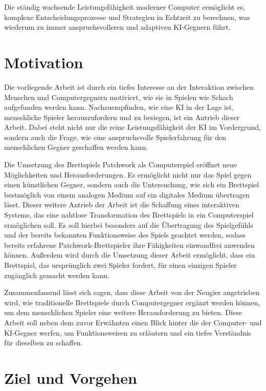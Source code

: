 Die ständig wachsende Leistungsfähigkeit moderner Computer ermöglicht es, komplexe Entscheidungsprozesse und Strategien in Echtzeit zu berechnen, was wiederum zu immer anspruchsvolleren und adaptiven \ac{KI}-Gegnern führt.

\section{Motivation}
\label{chapter:motivation}

Die vorliegende Arbeit ist durch ein tiefes Interesse an der Interaktion zwischen Menschen und Computergegnern motiviert, wie sie in Spielen wie Schach aufgefunden werden kann. Nachzuempfinden, wie eine \ac{KI} in der Lage ist, menschliche Spieler herauszufordern und zu besiegen, ist ein Antrieb dieser Arbeit. Dabei steht nicht nur die reine Leistungsfähigkeit der \ac{KI} im Vordergrund, sondern auch die Frage, wie eine anspruchsvolle Spielerfahrung für den menschlichen Gegner geschaffen werden kann.

Die Umsetzung des Brettspiels Patchwork als Computerspiel eröffnet neue Möglichkeiten und Herausforderungen. Es ermöglicht nicht nur das Spiel gegen einen künstlichen Gegner, sondern auch die Untersuchung, wie sich ein Brettspiel bestmöglich von einem analogen Medium auf ein digitales Medium übertragen lässt. Dieser weitere Antrieb der Arbeit ist die Schaffung eines interaktiven Systems, das eine nahtlose Transformation des Brettspiels in ein Computerspiel ermöglichen soll. Es soll hierbei besonders auf die Übertragung des Spielgefühls und der bereits bekannten Funktionsweise des Spiels geachtet werden, sodass bereits erfahrene Patchwork-Brettspieler ihre Fähigkeiten einwandfrei anwenden können. Außerdem wird durch die Umsetzung dieser Arbeit ermöglicht, dass ein Brettspiel, das ursprünglich zwei Spieler fordert, für einen einzigen Spieler zugänglich gemacht werden kann.

Zusammenfassend lässt sich sagen, dass diese Arbeit von der Neugier angetrieben wird, wie traditionelle Brettspiele durch Computergegner ergänzt werden können, um dem menschlichen Spieler eine weitere Herausforderung zu bieten. Diese Arbeit soll neben dem zuvor Erwähnten einen Blick hinter die der Computer- und \ac{KI}-Gegner werfen, um Funktionsweisen zu erläutern und ein tiefes Verständnis für dieselben zu schaffen.

\section{Ziel und Vorgehen}
\label{chapter:ziel-und-vorgehen}

